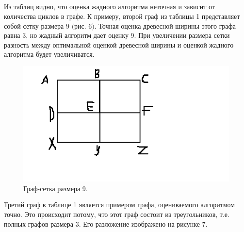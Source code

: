 \documentclass[a4paper,12pt]{article}
\begin{document}
\begin{large}
\begin{large}
		\\
		\\
		\\
		\\
		\\
		\\
		\\
		\\
		\\

		Из таблиц видно, что оценка жадного алгоритма неточная и зависит от количества циклов в графе. 
		К примеру, второй граф из таблицы 1 представляет собой сетку размера 9 $($рис. $6)$.
		Точная оценка древесной ширины этого графа равна 3, но жадный алгоритм дает оценку 9.
		При увеличении размера сетки разность между оптимальной оценкой древесной ширины и оценкой жадного алгоритма будет увеличиватся.

		\begin{figure}[htbp]
			\centering
				\includegraphics[scale=0.4]{cell.png}
				\caption{Граф-сетка размера 9.}
				\label{fig:testImage}
		\end{figure}

		Третий граф в таблице 1 является примером графа, оцениваемого алгоритмом точно. Это происходит потому, что этот граф состоит из треугольников, т.е. полных графов размера 3.
		Его разложение изображено на рисунке 7.


\end{large}
\end{large}
\end{document}
